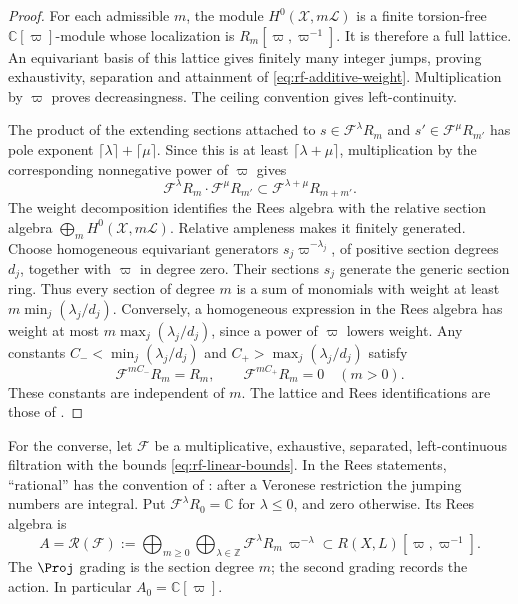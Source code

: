 \begin{proof}
For each admissible $m$, the module $H^0(\mathcal X,m\mathcal L)$ is a finite torsion-free $\mathbb C[\varpi]$-module whose localization is $R_m[\varpi,\varpi^{-1}]$. It is therefore a full lattice. An equivariant basis of this lattice gives finitely many integer jumps, proving exhaustivity, separation and attainment of \eqref{eq:rf-additive-weight}. Multiplication by $\varpi$ proves decreasingness. The ceiling convention gives left-continuity.

The product of the extending sections attached to $s\in\mathcal F^\lambda R_m$ and $s'\in\mathcal F^\mu R_{m'}$ has pole exponent $\lceil\lambda\rceil+\lceil\mu\rceil$. Since this is at least $\lceil\lambda+\mu\rceil$, multiplication by the corresponding nonnegative power of $\varpi$ gives
\[
 \mathcal F^\lambda R_m\cdot\mathcal F^\mu R_{m'}
       \subset\mathcal F^{\lambda+\mu}R_{m+m'}.
\tag{65.4}\label{eq:rf-multiplicativity}
\]
The weight decomposition identifies the Rees algebra with the relative section algebra $\bigoplus_m H^0(\mathcal X,m\mathcal L)$. Relative ampleness makes it finitely generated. Choose homogeneous equivariant generators $s_j\varpi^{-\lambda_j}$, of positive section degrees $d_j$, together with $\varpi$ in degree zero. Their sections $s_j$ generate the generic section ring. Thus every section of degree $m$ is a sum of monomials with weight at least $m\min_j(\lambda_j/d_j)$. Conversely, a homogeneous expression in the Rees algebra has weight at most $m\max_j(\lambda_j/d_j)$, since a power of $\varpi$ lowers weight. Any constants $C_-<\min_j(\lambda_j/d_j)$ and $C_+>\max_j(\lambda_j/d_j)$ satisfy
\[
 \mathcal F^{mC_-}R_m=R_m,\qquad \mathcal F^{mC_+}R_m=0
 \quad(m>0).
\tag{65.5}\label{eq:rf-linear-bounds}
\]
These constants are independent of $m$. The lattice and Rees identifications are those of \cite[Section~1.2 and Proposition~2.15]{BHJ17}.
\end{proof}

For the converse, let $\mathcal F$ be a multiplicative, exhaustive, separated, left-continuous filtration with the bounds \eqref{eq:rf-linear-bounds}. In the Rees statements, ``rational'' has the convention of : after a Veronese restriction the jumping numbers are integral. Put $\mathcal F^\lambda R_0=\mathbb C$ for $\lambda\leq0$, and zero otherwise. Its Rees algebra is
\[
 A=\mathcal R(\mathcal F)
 :=\bigoplus_{m\geq0}\bigoplus_{\lambda\in\mathbb Z}
       \mathcal F^\lambda R_m\,\varpi^{-\lambda}
       \subset R(X,L)[\varpi,\varpi^{-1}].
\tag{65.6}\label{eq:rf-rees-algebra}
\]
The $\Proj$ grading is the section degree $m$; the second grading records the action. In particular $A_0=\mathbb C[\varpi]$.

